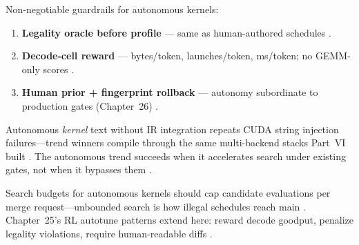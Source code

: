 Non-negotiable guardrails for autonomous kernels:
\begin{enumerate}
\item \textbf{Legality oracle before profile} --- same as human-authored schedules \citep{yirage2026,chen2020compilerbasedhardw,patel2025llminference,kwon2023vllm,liu2024deepseekv3,memoryfloor2026,taxbreak2026,amd2024aie,dlbook,semianalysis2024tma,amd2024xdna,dao2022flashattention,dao2023flashdecoding,nvidia2024cudagraphs,nvidia2022hopper,amd2024xdna}.
\item \textbf{Decode-cell reward} --- bytes/token, launches/token, ms/token; no GEMM-only scores \citep{memoryfloor2026,taxbreak2026,patel2025llminference,yirage2026,chen2020compilerbasedhardw,kwon2023vllm,liu2024deepseekv3,amd2024aie,dlbook,semianalysis2024tma,amd2024xdna,dao2022flashattention,dao2023flashdecoding,nvidia2024cudagraphs,nvidia2022hopper}.
\item \textbf{Human prior + fingerprint rollback} --- autonomy subordinate to production gates (Chapter~26) \citep{patel2025llminference,yirage2026,chen2020compilerbasedhardw,kwon2023vllm,liu2024deepseekv3,memoryfloor2026,taxbreak2026,amd2024aie,dlbook,semianalysis2024tma,amd2024xdna,dao2022flashattention,dao2023flashdecoding,nvidia2024cudagraphs,nvidia2022hopper,amd2024xdna}.
\end{enumerate}

Autonomous \emph{kernel} text without IR integration repeats CUDA string injection failures---trend winners compile through the same multi-backend stacks Part~VI built \citep{chen2020compilerbasedhardw,yirage2026,patel2025llminference,kwon2023vllm,liu2024deepseekv3,memoryfloor2026,taxbreak2026,amd2024aie,dlbook,semianalysis2024tma,amd2024xdna,dao2022flashattention,dao2023flashdecoding,nvidia2024cudagraphs,nvidia2022hopper,amd2024xdna}. The autonomous trend succeeds when it accelerates search under existing gates, not when it bypasses them \citep{yirage2026,chen2020compilerbasedhardw,patel2025llminference,memoryfloor2026,taxbreak2026,kwon2023vllm,liu2024deepseekv3,amd2024aie,dlbook,semianalysis2024tma,amd2024xdna,dao2022flashattention,dao2023flashdecoding,nvidia2024cudagraphs,nvidia2022hopper,amd2024xdna}.

Search budgets for autonomous kernels should cap candidate evaluations per merge request---unbounded search is how illegal schedules reach main \citep{yirage2026,chen2020compilerbasedhardw,patel2025llminference,memoryfloor2026,taxbreak2026,kwon2023vllm,liu2024deepseekv3,amd2024aie,dlbook,semianalysis2024tma,amd2024xdna,dao2022flashattention,dao2023flashdecoding,nvidia2024cudagraphs,nvidia2022hopper,amd2024xdna}. Chapter~25's RL autotune patterns extend here: reward decode goodput, penalize legality violations, require human-readable diffs \citep{yirage2026,chen2020compilerbasedhardw,patel2025llminference,memoryfloor2026,taxbreak2026,kwon2023vllm,liu2024deepseekv3,amd2024aie,dlbook,semianalysis2024tma,amd2024xdna,dao2022flashattention,dao2023flashdecoding,nvidia2024cudagraphs,nvidia2022hopper,amd2024xdna}.

